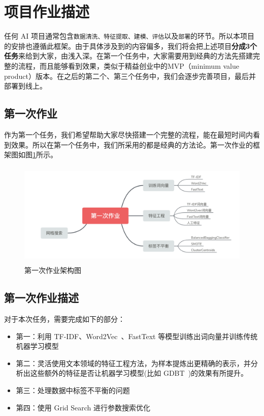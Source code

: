 \section{项目作业描述}

\noindent 任何 AI 项目通常包含\texttt{数据清洗、特征提取、建模、评估}以及\texttt{部署}的环节。所以本项目的安排也遵循此框架。由于具体涉及到的内容偏多，我们将会把上述项目\textbf{分成3个任务}来给到大家，由浅入深。在第一个任务中，大家需要用到经典的方法先搭建完整的流程，而且能够看到效果，类似于精益创业中的MVP（minimum value product）版本。在之后的第二个、第三个任务中，我们会逐步完善项目，最后并部署到线上。 

\subsection{第一次作业}
\noindent 作为第一个任务，我们希望帮助大家尽快搭建一个完整的流程，能在最短时间内看到效果。所以在第一个任务中，我们所采用的都是经典的方法论。第一次作业的框架图如图\ref{fig:book_task1_mindmap}所示。

\begin{figure}[ht]
 \centering
 \includegraphics[height=5cm]{images/book_task1_mindmap}
 \caption{第一次作业架构图}
 \label{fig:book_task1_mindmap}
\end{figure}

\subsection{第一次作业描述}
\noindent 对于本次任务，需要完成如下的部分：
\begin{itemize}
    \item 第一：利用 TF-IDF、Word2Vec~\cite{DBLP:journals/corr/MikolovSCCD13}、FastText 等模型训练出词向量并训练传统机器学习模型
    \item 第二：灵活使用文本领域的特征工程方法，为样本提炼出更精确的表示，并分析出这些额外的特征是否让机器学习模型(比如 GDBT~\cite{friedman2001greedy})的效果有所提升。
    \item 第三：处理数据中标签不平衡的问题
    \item 第四：使用 Grid Search 进行参数搜索优化
\end{itemize}


